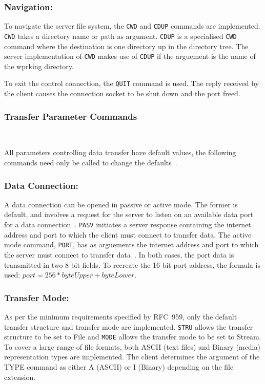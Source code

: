 \documentclass[10pt,twocolumn]{witseiepaper}
\begin{document}
\subsubsection*{Navigation:}
To navigate the server file system, the \texttt{CWD} and \texttt{CDUP} commands are implemented. \texttt{CWD} takes a directory name or path as argument. \texttt{CDUP} is a specialised \texttt{CWD} command where the destination is one directory up in the directory tree. The server implementation of \texttt{CWD} makes use of \texttt{CDUP} if the arguement is the name of the wprking directory.

To exit the control connection, the \texttt{QUIT} command is used. The reply received by the client causes the connection socket to be shut down and the port freed. 

\vspace*{-2mm}
\subsubsection{Transfer Parameter Commands} $   $

All parameters controlling data transfer have default values, the following commands need only be called to change the defaults~\cite{rfc959}. 

\vspace*{-2mm}
\subsubsection*{Data Connection:} A data connection can be opened in passive or active mode. The former is default, and involves a request for the server to listen on an available data port for a data connection~\cite{rfc959}. \texttt{PASV} initiates a server response 
containing the internet address and port to which the client must connect to transfer data. The active mode command, \texttt{PORT}, has as arguements the internet address and port to which the server must connect to transfer data~\cite{rfc959}. In both cases, the port data is transmitted in two 8-bit fields. To recreate the 16-bit port address, the formula is used: $port = 256*byteUpper + byteLower$.

\vspace*{-2mm}
\subsubsection*{Transfer Mode:} 
As per the minimum requirements specified by RFC~959, only the default transfer structure and transfer mode are implemented. \texttt{STRU} allows the transfer structure to be set to File and \texttt{MODE} allows the transfer mode to be set to Stream. To cover a large range of file formats, both ASCII (text files) and Binary (media) representation types are implemented. The client determines the argument of the TYPE command as either A (ASCII) or I (Binary) depending on the file extension.
\end{document}
